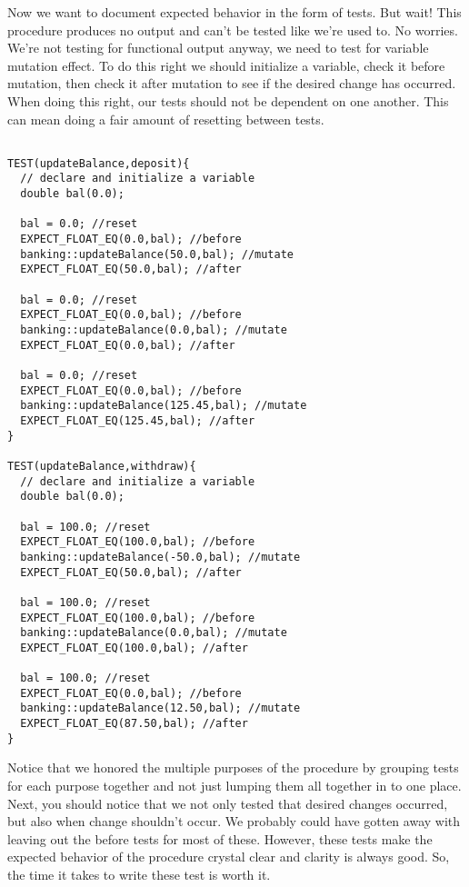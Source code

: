 \documentclass[]{tufte-handout}
\begin{document}
Now we want to document expected behavior in the form of tests.  But wait! This procedure produces no output and can't be tested like we're used to.  No worries. We're not testing for functional output anyway, we need to test for variable mutation effect. To do this right we should initialize a variable, check it before mutation, then check it after mutation to see if the desired change has occurred. When doing this right, our tests should not be dependent on one another. This can mean doing a fair amount of resetting between tests. 
\begin{verbatim}

TEST(updateBalance,deposit){
  // declare and initialize a variable
  double bal(0.0);

  bal = 0.0; //reset
  EXPECT_FLOAT_EQ(0.0,bal); //before
  banking::updateBalance(50.0,bal); //mutate
  EXPECT_FLOAT_EQ(50.0,bal); //after

  bal = 0.0; //reset
  EXPECT_FLOAT_EQ(0.0,bal); //before
  banking::updateBalance(0.0,bal); //mutate
  EXPECT_FLOAT_EQ(0.0,bal); //after

  bal = 0.0; //reset
  EXPECT_FLOAT_EQ(0.0,bal); //before
  banking::updateBalance(125.45,bal); //mutate
  EXPECT_FLOAT_EQ(125.45,bal); //after
}

TEST(updateBalance,withdraw){
  // declare and initialize a variable
  double bal(0.0);

  bal = 100.0; //reset
  EXPECT_FLOAT_EQ(100.0,bal); //before
  banking::updateBalance(-50.0,bal); //mutate
  EXPECT_FLOAT_EQ(50.0,bal); //after

  bal = 100.0; //reset
  EXPECT_FLOAT_EQ(100.0,bal); //before
  banking::updateBalance(0.0,bal); //mutate
  EXPECT_FLOAT_EQ(100.0,bal); //after

  bal = 100.0; //reset
  EXPECT_FLOAT_EQ(0.0,bal); //before
  banking::updateBalance(12.50,bal); //mutate
  EXPECT_FLOAT_EQ(87.50,bal); //after
}
\end{verbatim}
Notice that we honored the multiple purposes of the procedure by grouping tests for each purpose together and not just lumping them all together in to one place. Next, you should notice that we not only tested that desired changes occurred, but also when change shouldn't occur. We probably could have gotten away with leaving out the before tests for most of these. However, these tests make the expected behavior of the procedure crystal clear and clarity is always good. So, the time it takes to write these test is worth it.  
\end{document}
